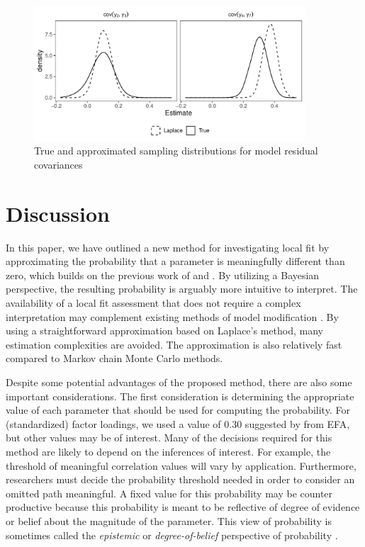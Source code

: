 \documentclass[man, noextraspace, floatsintext, 12pt]{apa7}
\begin{document}
\begin{figure}
\centering
\includegraphics[width=0.9\textwidth]{fig/sampling_dist}
\caption{True and approximated sampling distributions for model residual covariances}
\label{fig:dist}
\end{figure}


\section{Discussion}

In this paper, we have outlined a new method for investigating local fit by approximating the probability that a parameter is meaningfully different than zero, which builds on the previous work of \textcite{Lee2016} and \textcite{Shi2019}.
By utilizing a Bayesian perspective, the resulting probability is arguably more intuitive to interpret.
The availability of a local fit assessment that does not require a complex interpretation may complement existing methods of model modification \citep[e.g., ][]{Sorbom1989, Kaplan1989, Wald1943}.
By using a straightforward approximation based on Laplace's method, many estimation complexities are avoided.
The approximation is also relatively fast compared to Markov chain Monte Carlo methods.

Despite some potential advantages of the proposed method, there are also some important considerations.
The first consideration is determining the appropriate value of each parameter that should be used for computing the probability. 
For (standardized) factor loadings, we used a value of 0.30 suggested by \textcite{Benson1998} from EFA, but other values may be of interest.
Many of the decisions required for this method are likely to depend on the inferences of interest. 
For example, the threshold of meaningful correlation values will vary by application. 
Furthermore, researchers must decide the probability threshold needed in order to consider an omitted path meaningful. 
A fixed value for this probability may be counter productive because this probability is meant to be reflective of degree of evidence or belief about the magnitude of the parameter.
This view of probability is sometimes called the \textit{epistemic} or \textit{degree-of-belief} perspective of probability \citep[][, p. 14-15]{Levy2016, deFinetti1974}.
\end{document}
